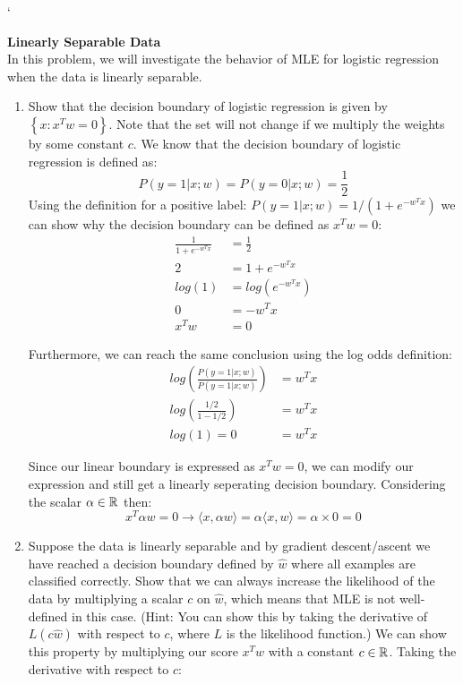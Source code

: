 `\documentclass{article}
\newcommand{\nyuparagraph}[1]{\vspace{0.3cm}\textcolor{nyupurple}{\bf \large #1}\\}
\theoremstyle{plain}
\theoremstyle{definition}
\begin{document}
\nyuparagraph{Linearly Separable Data}
\label{sec:linear}
In this problem, we will investigate the behavior of MLE for logistic regression when the data is linearly separable.

\begin{enumerate}
  \setcounter{enumi}{\value{saveenum}}
\item Show that the decision boundary of logistic regression is given by $\left\{x\colon x^Tw=0\right\}$.
Note that the set will not change if we multiply the weights by some constant $c$.
\subitem
We know that the decision boundary of logistic regression is defined as: $$P(y=1|x;w) = P(y=0|x;w) = \frac{1}{2}$$
Using the definition for a positive label: $P(y=1|x;w) = 1/(1+e^{-w^Tx})$ we can show why the decision boundary can be defined as $x^Tw=0$:
\begin{equation}
    \begin{split}
        \frac{1}{1+e^{-w^Tx}} &= \frac{1}{2} \\
        2 &= 1 + e^{-w^Tx} \\
        log(1) &= log(e^{-w^Tx}) \\
        0 &= -w^Tx \\
        x^Tw &= 0 
    \end{split}
\end{equation}

Furthermore, we can reach the same conclusion using the log odds definition:
\begin{equation}
    \begin{split}
    log\left(\frac{P(y=1|x;w)}{P(y=1|x;w)}\right) &= w^Tx \\
    log\left(\frac{1/2}{1-1/2}\right) &= w^Tx \\
    log(1) = 0 &= w^Tx
    \end{split}
\end{equation}

Since our linear boundary is expressed as $x^Tw=0$, we can modify our expression and still get a linearly seperating decision boundary. Considering the scalar $\alpha \in \mathbb{R}$ then:
$$
    x^T\alpha w =0 \rightarrow \langle x, \alpha w \rangle = \alpha \langle x,w \rangle = \alpha \times 0 = 0
$$



\item Suppose the data is linearly separable and by gradient descent/ascent we have reached a decision boundary defined by $\hat{w}$ where all examples are classified correctly. 
Show that we can always increase the likelihood of the data by multiplying a scalar $c$ on $\hat{w}$,
which means that MLE is not well-defined in this case.
{(Hint: You can show this by taking the derivative of $L(c\hat{w})$ with respect to $c$, where $L$ is the likelihood function.)}
\subitem 
We can show this property by multiplying our score $x^Tw$ with a constant $c \in \mathbb{R}$. Taking the derivative with respect to $c$:


\end{enumerate}
\end{document}
